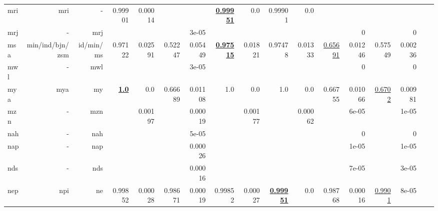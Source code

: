 \documentclass[11pt]{article}
\begin{document}
\begin{table*}[h]
{\begin{tabular}{lrrrrrrrrrrrrrrrr}
mri         & mri         & -         & 0.99901         & 0.00014         &          &          & \textbf{\underline{0.99951}}         & 0.0         & 0.99901         & 0.0         &          &          &          &          \\
mrj         & -         & mrj         &          &          &          & 3e-05         &          &          &          &          &          & 0         &          & 0         \\
msa         & min/ind/bjn/zsm         & id/min/ms         & 0.97122         & 0.02591         & 0.52247         & 0.05449         & \textbf{\underline{0.97515}}         & 0.01821         & 0.97478         & 0.01333         & \underline{0.65691}         & 0.01246         & 0.57549         & 0.00236         \\
mwl         & -         & mwl         &          &          &          & 3e-05         &          &          &          &          &          & 0         &          & 0         \\
mya         & mya         & my         & \textbf{\underline{1.0}}         & 0.0         & 0.66689         & 0.01108         & 1.0         & 0.0         & 1.0         & 0.0         & 0.66755         & 0.01066         & \underline{0.6702}         & 0.00981         \\
mzn         & -         & mzn         &          & 0.00197         &          & 0.00019         &          & 0.00177         &          & 0.00062         &          & 6e-05         &          & 1e-05         \\
nah         & -         & nah         &          &          &          & 5e-05         &          &          &          &          &          & 0         &          & 0         \\
nap         & -         & nap         &          &          &          & 0.00026         &          &          &          &          &          & 1e-05         &          & 1e-05         \\
nds         & -         & nds         &          &          &          & 0.00016         &          &          &          &          &          & 7e-05         &          & 3e-05         \\
nep         & npi         & ne         & 0.99852         & 0.00028         & 0.98671         & 0.00019         & 0.99852         & 0.00027         & \textbf{\underline{0.99951}}         & 0.0         & 0.98768         & 0.00016         & \underline{0.9901}         & 8e-05         \\

\end{tabular}}
\end{table*}
\end{document}
